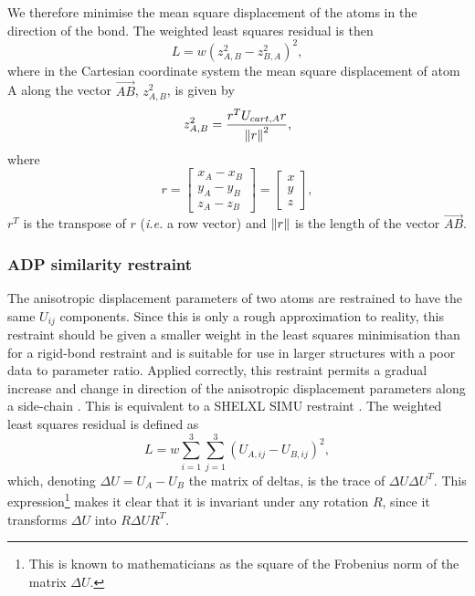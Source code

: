 \documentclass[pdf]{iucr}
\begin{document}
We therefore minimise the mean square displacement of the atoms in the direction of the bond. The weighted least squares residual is then
\begin{equation}
\label{eqn:rigid_bond}
L = w(z^2_{A,B} - z^2_{B,A})^2,
\end{equation}
where in the Cartesian coordinate system the mean square displacement of atom A
along the vector $\overrightarrow{AB}$, $z^2_{A,B}$, is given by
\begin{equation}
z^2_{A,B} = \frac{r^TU_{cart,A}r}{\left\| r \right\|^2},
\end{equation}
where
\begin{equation}
r = \begin{bmatrix} x_A - x_B\\y_A - y_B\\z_A - z_B \end{bmatrix}
= \begin{bmatrix} x\\y\\z \end{bmatrix},
\end{equation}
$r^T$ is the transpose of $r$ (\textit{i.e.} a row vector) and
$\left\| r \right\|$ is the length of the vector $\overrightarrow{AB}$.



\subsubsection{ADP similarity restraint}
\label{ADP:similarity}
The anisotropic displacement parameters of two atoms are restrained to have the same $U_{ij}$ components. Since this is only a rough approximation to reality, this restraint should be given a smaller weight in the least squares minimisation than for a rigid-bond restraint and is suitable for use in larger structures with a poor data to parameter ratio. Applied correctly, this restraint permits a gradual increase and change in direction of the anisotropic displacement parameters along a side-chain \cite{SHELX:man97}. This is equivalent to a SHELXL SIMU restraint \cite{SHELX:man97}.
The weighted least squares residual is defined as
\begin{equation}
\label{eqn:adp_similarity}
L = w \sum_{i=1}^3 \sum_{j=1}^3 (U_{A,ij} - U_{B,ij})^2,
\end{equation}
which, denoting $\Delta U=U_A - U_B$ the matrix of deltas, is the trace of $\Delta U \Delta U^T$. This expression\footnote{This is known to mathematicians as the square of the Frobenius norm of the matrix $\Delta U$.} makes it clear that it is invariant under any rotation $R$, since it transforms $\Delta U$ into $R\Delta U R^T$. 
\end{document}

